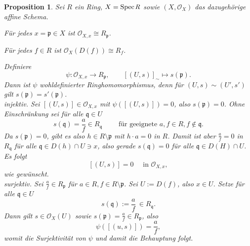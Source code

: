 \documentclass[11pt]{book}
\newtheorem{proposition}[theorem]{Proposition}
\theoremstyle{nonumberbreak}
\newenvironment{pr}[1][]{\ifthenelse{\equal{#1}{}}{\proof}{\proof[#1]}\rm}{\endproof}
\newcommand{\spec}{\mathrm{Spec} \hspace{1pt} }
\newcommand{\p}{\mathfrak{p}}
\newcommand{\q}{\mathfrak{q}}
\begin{document}
\begin{spacing}{1.4}
\begin{proposition}   %
Sei $R$ ein Ring, $X= \spec\it{R}$ sowie $(X,\mathcal{O}_X)$ das dazugehörige affine Schema.
\begin{compactenum}
\item Für jedes $x=\p \in X$ ist $\mathcal{O}_{X,x} \cong R_{\p}$.
\item Für jedes $f \in R$ ist $\mathcal{O}_X\left(D(f) \right) \cong R_f$.
\end{compactenum}
\begin{pr}
\begin{compactenum}
\item Definiere
$$\psi: \mathcal{O}_{X,x} \longrightarrow R_{\p}, \qquad [(U,s)]_{\sim} \mapsto s(\p).$$
Dann ist $\psi$ wohldefinierter Ringhomomorphismus, denn für $(U,s) \sim (U',s')$ gilt $s(\p)=s'(\p)$.\\
\textit{injektiv.} Sei $[(U,s)] \in \mathcal{O}_{X,x}$ mit $\psi\left([(U,s)]\right) = 0$, also $s(\p)=0$. Ohne Einschränkung sei für alle $\q \in U$
$$s(\q)= \frac{a}{f} \in R_{\q} \qquad \textrm{ für geeignete } a,f \in R, f \notin \q.$$
Da $s(\p)=0$, gibt es also $h \in R \setminus \p$ mit $h \cdot a = 0$ in $R$. Damit ist aber $\frac{a}{f}=0$ in $R_{\q}$ für alle $\q \in D(h) \cap U \ni x$, also gerade $s(\q)=0$ für alle $\q \in D(H) \cap U$. Es folgt
$$[(U,s)] = 0 \quad \textrm{ in } \mathcal{O}_{X,x},$$
wie gewünscht.\\
\textit{surjektiv.} Sei $\frac{a}{f} \in R_{\p}$ für $a \in R, f \in R\setminus \p$. Sei $U:= D(f)$, also $x \in U$. Setze für alle $\q \in U$
$$s(\q) := \frac{a}{f}  \ \in R_{\q}.$$
Dann gilt $s \in \mathcal{O}_X(U)$ sowie $s(\p)= \frac{a}{f} \in R_{\p}$, also 
$$\psi\left([(u,s)]\right) = \frac{a}{f},$$
womit die Surjektivität von $\psi$ und damit die Behauptung folgt.


\end{compactenum}
\end{pr}
\end{proposition}
\end{spacing}
\end{document}
